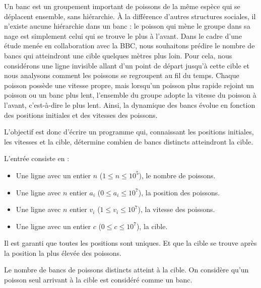 \problemname{}


Un banc est un groupement important de poissons de la même espèce qui se déplacent ensemble, sans hiérarchie. À la différence d'autres structures sociales, il n'existe aucune hiérarchie dans un banc : le poisson qui mène le groupe dans sa nage est simplement celui qui se trouve le plus à l'avant.
Dans le cadre d'une étude menée en collaboration avec la BBC, nous souhaitons prédire le nombre de bancs qui atteindront une cible quelques mètres plus loin.
Pour cela, nous considérons une ligne invisible allant d'un point de départ jusqu'à cette cible et nous analysons comment les poissons se regroupent au fil du temps.
Chaque poisson possède une vitesse propre, mais lorsqu'un poisson plus rapide rejoint un poisson ou un banc plus lent, l'ensemble du groupe adopte la vitesse du poisson à l'avant, c'est-à-dire le plus lent.
Ainsi, la dynamique des bancs évolue en fonction des positions initiales et des vitesses des poissons.

L'objectif est donc d'écrire un programme qui, connaissant les positions initiales, les vitesses et la cible, détermine combien de bancs distincts atteindront la cible.

\begin{Input}
    L'entrée consiste en :
    \begin{itemize}
        \item Une ligne avec un entier $n$ ($1 \leq n \leq 10^{5}$), le nombre de poissons.
        \item Une ligne avec $n$ entier $a_i$ ($0 \leq a_i \leq 10^{7}$), la position des poissons.
        \item Une ligne avec $n$ entier $v_i$ ($1 \leq v_i \leq 10^{7}$), la vitesse des poissons.
        \item Une ligne avec un entier $c$ ($0 \leq c \leq 10^{7}$), la cible.
    \end{itemize}
    Il est garanti que toutes les positions sont uniques. Et que la cible se trouve après la position la plus élevée des poissons.
\end{Input}

\begin{Output}
   Le nombre de bancs de poissons distincts atteint à la cible. On considère qu'un poisson seul arrivant à la cible est considéré comme un banc.
\end{Output}
